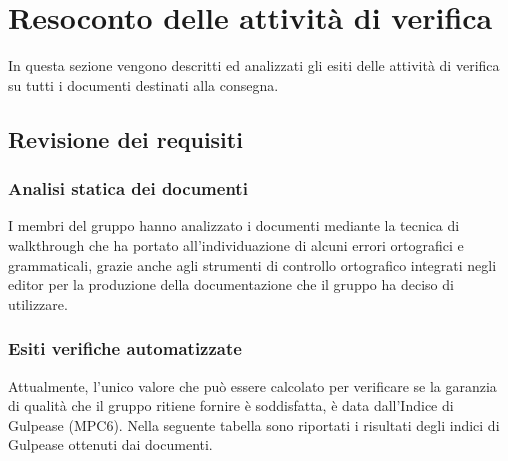 \section{Resoconto delle attività di verifica}
In questa sezione vengono descritti ed analizzati gli esiti delle attività di verifica su tutti i documenti destinati alla consegna.

\subsection{Revisione dei requisiti}

\subsubsection{Analisi statica dei documenti}
I membri del gruppo \Gruppo{} hanno analizzato i documenti mediante la tecnica di walkthrough che ha portato all'individuazione di 
alcuni errori ortografici e grammaticali, grazie anche agli strumenti di controllo ortografico integrati negli editor per la produzione
della documentazione che il gruppo ha deciso di utilizzare.

\subsubsection{Esiti verifiche automatizzate}
Attualmente, l'unico valore che può essere calcolato per verificare se la garanzia di qualità che il gruppo ritiene fornire è
soddisfatta, è data dall'Indice di Gulpease (MPC6).
Nella seguente tabella sono riportati i risultati degli indici di Gulpease ottenuti dai documenti.

